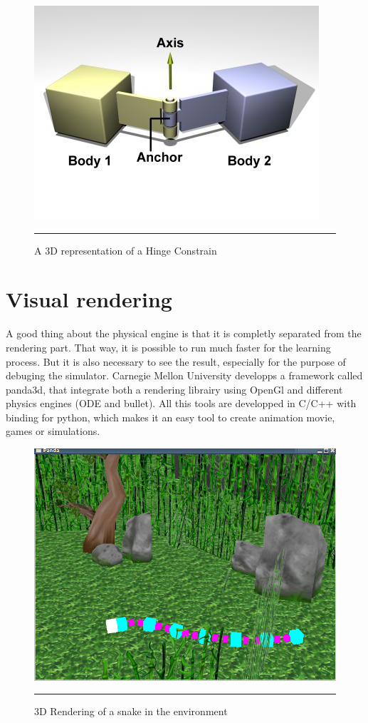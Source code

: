 \begin{figure}[htbp]
    \centering
    \includegraphics[scale=0.5]{Figures/hinge.jpg}
    \rule{35em}{0.5pt}
    \caption[A Hinge Constraint]{A 3D representation of a Hinge Constrain}
    \label{fig:Hinge}
\end{figure}

\section{Visual rendering}
A good thing about the physical engine is that it is completly separated from the rendering part. That way, it is possible to run much faster for the learning process. But it is also necessary to see the result, especially for the purpose of debuging the simulator. Carnegie Mellon University developps a framework called panda3d, that integrate both a rendering librairy using OpenGl and different physics engines (ODE and bullet). All this tools are developped in C/C++ with binding for python, which makes it an easy tool to create animation movie, games or simulations.


\begin{figure}[htbp]
    \centering
    \includegraphics[scale=0.5]{Figures/snake.png}
    \rule{35em}{0.5pt}
    \caption[Simulated Snake in the environment]{3D Rendering of a snake in the environment}
    \label{fig:Snake}
\end{figure}



